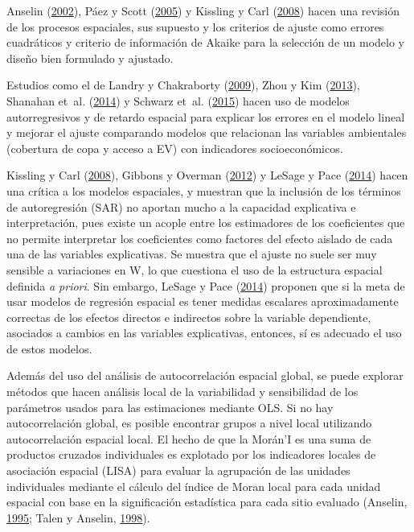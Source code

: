 \documentclass[12pt,a4paper,oneside, openany]{book}
\theoremstyle{definition}
\theoremstyle{definition}
\theoremstyle{definition}
\theoremstyle{remark}
\begin{document}
Anselin (\protect\hyperlink{ref-anselin_under_2002}{2002}), Páez y Scott
(\protect\hyperlink{ref-paez_spatial_2005}{2005}) y Kissling y Carl
(\protect\hyperlink{ref-kissling_spatial_2008}{2008}) hacen una revisión
de los procesos espaciales, sus supuesto y los criterios de ajuste como
errores cuadráticos y criterio de información de Akaike para la
selección de un modelo y diseño bien formulado y ajustado.

Estudios como el de Landry y Chakraborty
(\protect\hyperlink{ref-landry_street_2009}{2009}), Zhou y Kim
(\protect\hyperlink{ref-zhou_social_2013}{2013}), Shanahan et~al.
(\protect\hyperlink{ref-shanahan_socio-economic_2014}{2014}) y Schwarz
et~al. (\protect\hyperlink{ref-schwarz_trees_2015}{2015}) hacen uso de
modelos autorregresivos y de retardo espacial para explicar los errores
en el modelo lineal y mejorar el ajuste comparando modelos que
relacionan las variables ambientales (cobertura de copa y acceso a EV)
con indicadores socioeconómicos.

Kissling y Carl (\protect\hyperlink{ref-kissling_spatial_2008}{2008}),
Gibbons y Overman (\protect\hyperlink{ref-gibbons_mostly_2012}{2012}) y
LeSage y Pace (\protect\hyperlink{ref-lesage_biggest_2014}{2014}) hacen
una crítica a los modelos espaciales, y muestran que la inclusión de los
términos de autoregresión (SAR) no aportan mucho a la capacidad
explicativa e interpretación, pues existe un acople entre los
estimadores de los coeficientes que no permite interpretar los
coeficientes como factores del efecto aislado de cada una de las
variables explicativas. Se muestra que el ajuste no suele ser muy
sensible a variaciones en W, lo que cuestiona el uso de la estructura
espacial definida \emph{a priori}. Sin embargo, LeSage y Pace
(\protect\hyperlink{ref-lesage_biggest_2014}{2014}) proponen que si la
meta de usar modelos de regresión espacial es tener medidas escalares
aproximadamente correctas de los efectos directos e indirectos sobre la
variable dependiente, asociados a cambios en las variables explicativas,
entonces, sí es adecuado el uso de estos modelos.

Además del uso del análisis de autocorrelación espacial global, se puede
explorar métodos que hacen análisis local de la variabilidad y
sensibilidad de los parámetros usados para las estimaciones mediante
OLS. Si no hay autocorrelación global, es posible encontrar grupos a
nivel local utilizando autocorrelación espacial local. El hecho de que
la Morán'I es una suma de productos cruzados individuales es explotado
por los indicadores locales de asociación espacial (LISA) para evaluar
la agrupación de las unidades individuales mediante el cálculo del
índice de Moran local para cada unidad espacial con base en la
significación estadística para cada sitio evaluado (Anselin,
\protect\hyperlink{ref-anselin1995local}{1995}; Talen y Anselin,
\protect\hyperlink{ref-talen_assessing_1998}{1998}).
\end{document}
